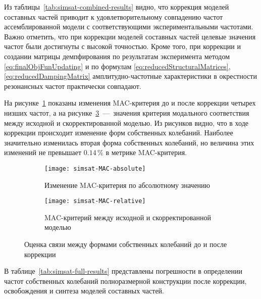 Из таблицы~\ref{tab:simsat-combined-results} видно, что коррекция моделей составных частей приводит к удовлетворительному совпадению частот ассемблированной модели с соответствующими экспериментальными частотами. Важно отметить, что при коррекции моделей составных частей целевые значения частот были достигнуты с высокой точностью. Кроме того, при коррекции и создании матрицы демпфирования по результатам эксперимента методом \eqref{eq:finalObjFunUpdating} и по формулам \eqref{eq:reducedStructuralMatrices}, \eqref{eq:reducedDampingMatrix} амплитудно-частотные характеристики в окрестности резонансных частот практически совпадают.

На рисунке~\ref{subfig:simsat-mac-absolute} показаны изменения MAC-критерия до и после коррекции четырех низших частот, а на рисунке~\ref{subfig:simsat-mac-relative}~---~значения критерия модального соответствия между исходной и скорректированной моделью. Из рисунков видно, что в ходе коррекции происходит изменение форм собственных колебаний. Наиболее значительно изменилась вторая форма собственных колебаний, но величина этих изменений не превышает $ 0.14 $\,\% в метрике MAC-критерия.

\begin{figure}[H]
	\centering
	\begin{subfigure}[t]{0.49\textwidth}
		\centering
		\texttt{[image: simsat-MAC-absolute]}
		\caption{Изменение MAC-критерия по абсолютному значению} \label{subfig:simsat-mac-absolute}
	\end{subfigure}
	\hfill
	\begin{subfigure}[t]{0.47\textwidth}
		\centering
		\texttt{[image: simsat-MAC-relative]}
		\caption{MAC-критерий между исходной и скорректированной моделью} \label{subfig:simsat-mac-relative}
	\end{subfigure}	
	\caption{Оценка связи между формами собственных колебаний до и после коррекции} 
\end{figure}

В таблице~\ref{tab:simsat-full-results} представлены погрешности в определении частот собственных колебаний полноразмерной конструкции после коррекции, освобождения и синтеза моделей составных частей. 

